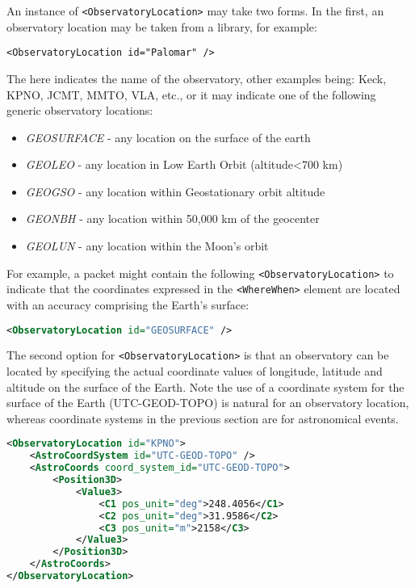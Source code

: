 \documentclass[11pt,a4paper]{ivoa}
\begin{document}
An instance of \verb|<ObservatoryLocation>| may take two forms. In the first,
an observatory location may be taken from a library, for example:
\begin{lstlisting}
<ObservatoryLocation id="Palomar" />
\end{lstlisting}

The  here indicates the name of the observatory, other examples being:
Keck, KPNO, JCMT, MMTO, VLA, etc., or it may indicate one of the following
generic observatory locations:
\begin{itemize}
\item \emph{GEOSURFACE} - any location on the surface of the earth
\item \emph{GEOLEO} - any location in Low Earth Orbit (altitude<700 km)
\item \emph{GEOGSO} - any location within Geostationary orbit altitude
\item \emph{GEONBH} - any location within 50,000 km of the geocenter
\item \emph{GEOLUN} - any location within the Moon's orbit
\end{itemize}

For example, a packet might contain the following \verb|<ObservatoryLocation>|
to indicate that the coordinates expressed in the \verb|<WhereWhen>| element are
located with an accuracy comprising the Earth's surface:
\begin{lstlisting}[language=XML]
<ObservatoryLocation id="GEOSURFACE" />
\end{lstlisting}

The second option for \verb|<ObservatoryLocation>| is that an observatory can be
located by specifying the actual coordinate values of longitude, latitude and
altitude on the surface of the Earth. Note the use of a coordinate system for
the surface of the Earth (UTC-GEOD-TOPO) is natural for an observatory location,
whereas coordinate systems in the previous section are for astronomical events.
\begin{lstlisting}[language=XML]
<ObservatoryLocation id="KPNO">
    <AstroCoordSystem id="UTC-GEOD-TOPO" />
    <AstroCoords coord_system_id="UTC-GEOD-TOPO">
        <Position3D>
            <Value3>
                <C1 pos_unit="deg">248.4056</C1>
                <C2 pos_unit="deg">31.9586</C2>
                <C3 pos_unit="m">2158</C3>
            </Value3>
        </Position3D>
    </AstroCoords>
</ObservatoryLocation>
\end{lstlisting}
\end{document}
